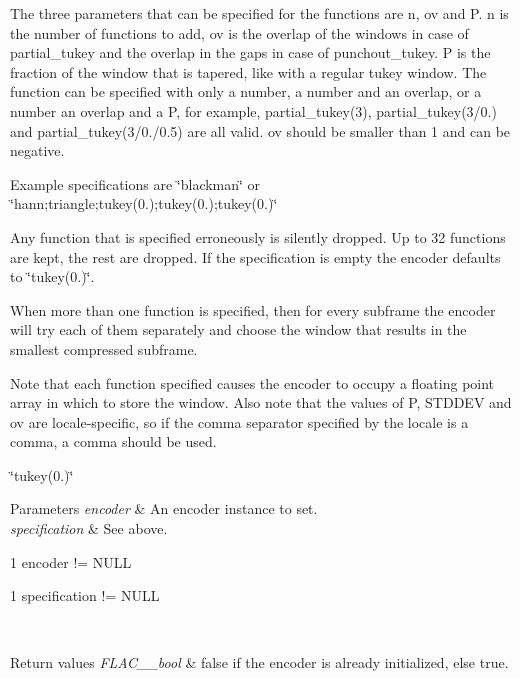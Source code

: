 The three parameters that can be specified for the functions are n, ov and P. n is the number of functions to add, ov is the overlap of the windows in case of partial\+\_\+tukey and the overlap in the gaps in case of punchout\+\_\+tukey. P is the fraction of the window that is tapered, like with a regular tukey window. The function can be specified with only a number, a number and an overlap, or a number an overlap and a P, for example, partial\+\_\+tukey(3), partial\+\_\+tukey(3/0.) and partial\+\_\+tukey(3/0./0.5) are all valid. ov should be smaller than 1 and can be negative.

Example specifications are {\ttfamily \char`\"{}blackman\char`\"{}} or {\ttfamily \char`\"{}hann;triangle;tukey(0.);tukey(0.);tukey(0.)\char`\"{}} 

Any function that is specified erroneously is silently dropped. Up to 32 functions are kept, the rest are dropped. If the specification is empty the encoder defaults to {\ttfamily \char`\"{}tukey(0.)\char`\"{}}.

When more than one function is specified, then for every subframe the encoder will try each of them separately and choose the window that results in the smallest compressed subframe.

Note that each function specified causes the encoder to occupy a floating point array in which to store the window. Also note that the values of P, S\+T\+D\+D\+EV and ov are locale-\/specific, so if the comma separator specified by the locale is a comma, a comma should be used.

{\ttfamily \char`\"{}tukey(0.)\char`\"{}} 
\begin{DoxyParams}{Parameters}
{\em encoder} & An encoder instance to set. \\
\hline
{\em specification} & See above.  
\begin{DoxyCode}
1 encoder != NULL 
\end{DoxyCode}
 
\begin{DoxyCode}
1 specification != NULL 
\end{DoxyCode}
 \\
\hline
\end{DoxyParams}

\begin{DoxyRetVals}{Return values}
{\em F\+L\+A\+C\+\_\+\+\_\+bool} & {\ttfamily false} if the encoder is already initialized, else {\ttfamily true}. \\
\hline
\end{DoxyRetVals}


